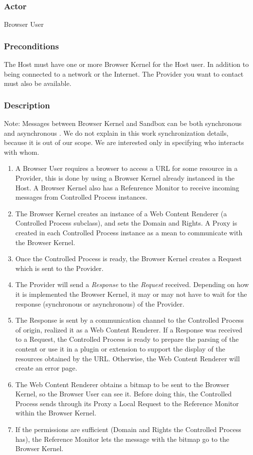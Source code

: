 \documentclass{sig-alternate-05-2015}
\begin{document}
    \subsubsection*{Actor} Browser User
    \subsubsection*{Preconditions} The Host must have one or more Browser Kernel for the Host user. In addition to being connected to a network or the Internet. The Provider you want to contact must also be available.
    \subsubsection*{Description}
    Note: Messages between Browser Kernel and Sandbox can be both synchronous and asynchronous \cite{firefoxIPC,GCIPC}. We do not explain in this work synchronization details, because it is out of our scope. We are interested only in specifying who interacts with whom.
      \begin{enumerate}
        \item A Browser User requires a browser to access a URL for some resource in a Provider, this is done by using a Browser Kernel already instanced in the Host. A Browser Kernel also has a Refenrence Monitor to receive incoming messages from Controlled Process instances.
        \item The Browser Kernel creates an instance of a Web Content Renderer (a Controlled Process subclass), and sets the Domain and Rights. A Proxy is created in each Controlled Process instance as a mean to communicate with the Browser Kernel.
        \item Once the Controlled Process is ready, the Browser Kernel creates a Request which is sent to the Provider.
        \item The Provider will send a \textit{Response} to the \textit{Request} received. Depending on how it is implemented the Browser Kernel, it may or may not have to wait for the response (synchronous or asynchronous) of the Provider.
        \item The Response is sent by a communication channel to the Controlled Process of origin, realized it as a Web Content Renderer. If a Response was received to a Request, the Controlled Process is ready to prepare the parsing of the content or use it in a plugin or extension to support the display of the resources obtained by the URL. Otherwise, the Web Content Renderer will create an error page.
        \item The Web Content Renderer obtains a bitmap to be sent to the Browser Kernel, so the Browser User can see it. Before doing this, the Controlled Process sends through its Proxy a Local Request to the Reference Monitor within the Browser Kernel.
        \item If the permissions are sufficient (Domain and Rights the Controlled Process has), the Reference Monitor lets the message with the bitmap go to the Browser Kernel.
      \end{enumerate}
\end{document}
